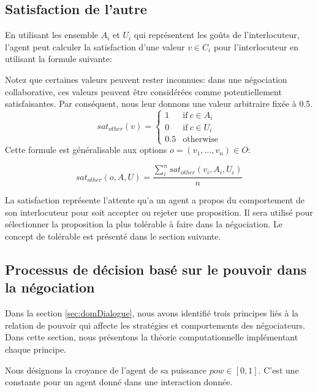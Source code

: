 			
			\subsection{Satisfaction de l'autre}
				En utilisant les ensemble $A_i$ et $U_i$ qui représentent les goûts de l'interlocuteur, l'agent peut calculer la satisfaction d'une valeur $v\in C_i$ pour l'interlocuteur en utilisant la formule suivante: 
				
				Notez que certaines valeurs peuvent rester inconnues: dans une négociation collaborative, ces valeurs peuvent être considérées comme potentiellement satisfaisantes. Par conséquent, nous leur donnons une valeur arbitraire fixée à 0.5.
					\begin{equation}
					sat_{other}(v)= \left\{\begin{array}{ll}
					1	 & \mathrm{if\ }  c \in A_i\\
					0    & \mathrm{if\ }c \in U_i\\
					0.5	 & \mathrm{otherwise}
					\end{array}\right.
					\end{equation}
				Cette formule est généralisable aux options $o=(v_1,\ldots,v_n) \in O$:
				
				\begin{equation}
				sat_{other}(o, A, U) = \frac{ \sum_{i}^{n} sat_{other}(v_i, A_i, U_i) } {n}
				\end{equation}
			
			La satisfaction représente l'attente qu'a un agent a propos du comportement de son interlocuteur pour soit accepter ou rejeter une proposition. Il sera utilisé pour sélectionner la proposition la plus tolérable à faire dans la négociation. Le concept de tolérable est présenté dans le section suivante.	
			
			
			\subsection{Processus de décision basé sur le pouvoir dans la négociation}
			\label{sec:decision}
			Dans la section \ref{sec:domDialogue}, nous avons identifié trois principes liés à la relation de pouvoir qui affecte les stratégies et comportements des négociateurs. Dans cette section, nous présentons la théorie computationnelle implémentant chaque principe.
			
			Nous désignons la croyance de l'agent de sa puissance $ pow \in [0, 1] $. C'est une constante pour un agent donné dans une interaction donnée.
			
